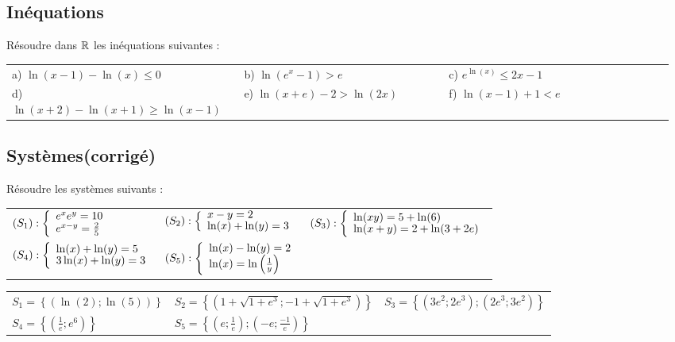 \documentclass[oneside,12pt]{book}          %
\begin{document}
\subsection{Inéquations}
Résoudre dans ${\mathbb R}$ les inéquations suivantes :\\
\renewcommand{\arraystretch}{1.6}
\begin{tabular}{p{0.34\linewidth} p{0.3\linewidth} p{0.33\linewidth}}
a) $\ln\left(x-1\right) - \ln\left(x\right) \leq 0$ & b) $\ln\left(e^{x}-1\right) > e$ & c) $e^{\ln\left(x\right)} \leq 2x-1$ \\
d) $\ln(x+2) - \ln(x+1) \geq \ln(x-1)$ & e) $\ln\left(x+e\right) - 2 > \ln\left(2x\right)$ & f) $\ln\left(x-1\right) + 1 < e$ \\
\end{tabular}



\subsection{Systèmes\quad\small{(corrigé)}}
Résoudre les systèmes suivants :

\renewcommand{\arraystretch}{2.5}
\begin{tabular}{p{} p{} p{}}
    $(S_1):\accol{e^xe^y=10\\e^{x-y}=\frac{2}{5}}$ & $(S_2):\accol{x-y=2\\\ln(x)+\ln(y)=3}$ & $(S_3):\accol{\ln(xy)=5+\ln(6)\\\ln(x+y)=2+\ln(3+2e)}$ \\
    $(S_4):\accol{\ln(x)+\ln(y)=5\\3\ln(x)+\ln(y)=3}$ & $(S_5):\accol{\ln(x)-\ln(y)=2\\\ln(x)=\ln\left(\frac{1}{y}\right)}$
\end{tabular}

\begin{sol}
\begin{tabular}{p{} p{} p{}}
	$S_1=\left\{\left(\ln(2);\ln(5)\right)\right\}$ & $S_2=\left\{\left(1+\sqrt{1+e^3};-1+\sqrt{1+e^3}\right)\right\}$ & $S_3=\left\{\left(3e^2;2e^3\right);\left(2e^3;3e^2\right)\right\}$\\
	$S_4=\left\{\left(\frac{1}{e};e^6\right)\right\}$ & $S_5=\left\{\left(e;\frac{1}{e}\right);\left(-e;\frac{-1}{e}\right)\right\}$
\end{tabular}
\end{sol}
\end{document}
